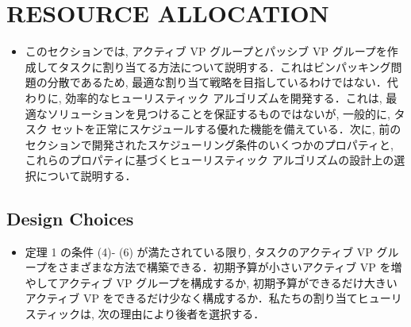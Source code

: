 
\section{RESOURCE ALLOCATION}
\label{sec: resource allocation}

\begin{frame}{}
    \begin{itemize}
        \item このセクションでは, アクティブ VP グループとパッシブ VP グループを作成してタスクに割り当てる方法について説明する．これはビンパッキング問題の分散であるため, 最適な割り当て戦略を目指しているわけではない．代わりに, 効率的なヒューリスティック アルゴリズムを開発する．これは, 最適なソリューションを見つけることを保証するものではないが, 一般的に, タスク セットを正常にスケジュールする優れた機能を備えている．次に, 前のセクションで開発されたスケジューリング条件のいくつかのプロパティと, これらのプロパティに基づくヒューリスティック アルゴリズムの設計上の選択について説明する．
    \end{itemize}
\end{frame}

\subsection{Design Choices}
\label{ssec: design choices}

\begin{frame}{}
    \begin{itemize}
        \item 定理 1 の条件 (4)- (6) が満たされている限り, タスクのアクティブ VP グループをさまざまな方法で構築できる．初期予算が小さいアクティブ VP を増やしてアクティブ VP グループを構成するか, 初期予算ができるだけ大きいアクティブ VP をできるだけ少なく構成するか．私たちの割り当てヒューリスティックは, 次の理由により後者を選択する．
    \end{itemize}
\end{frame}

